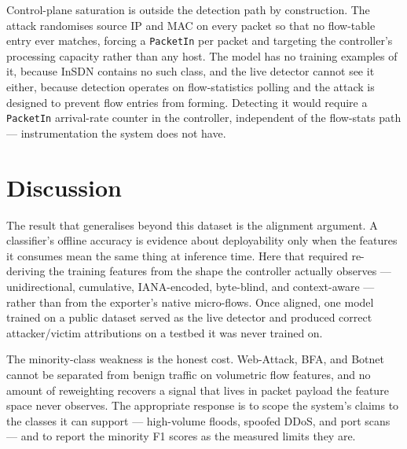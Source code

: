 \documentclass[11pt]{article}
\begin{document}
Control-plane saturation is outside the detection path by construction. The attack
randomises source IP and MAC on every packet so that no flow-table entry ever matches,
forcing a \texttt{PacketIn} per packet and targeting the controller's processing capacity
rather than any host. The model has no training examples of it, because InSDN contains no
such class, and the live detector cannot see it either, because detection operates on
flow-statistics polling and the attack is designed to prevent flow entries from forming.
Detecting it would require a \texttt{PacketIn} arrival-rate counter in the controller,
independent of the flow-stats path --- instrumentation the system does not have.

\section{Discussion}
The result that generalises beyond this dataset is the alignment argument. A classifier's
offline accuracy is evidence about deployability only when the features it consumes mean
the same thing at inference time. Here that required re-deriving the training features from
the shape the controller actually observes --- unidirectional, cumulative, IANA-encoded,
byte-blind, and context-aware --- rather than from the exporter's native micro-flows. Once
aligned, one model trained on a public dataset served as the live detector and produced
correct attacker/victim attributions on a testbed it was never trained on.

The minority-class weakness is the honest cost. Web-Attack, BFA, and Botnet cannot be
separated from benign traffic on volumetric flow features, and no amount of reweighting
recovers a signal that lives in packet payload the feature space never observes. The
appropriate response is to scope the system's claims to the classes it can support ---
high-volume floods, spoofed DDoS, and port scans --- and to report the minority F1 scores
as the measured limits they are.
\end{document}
